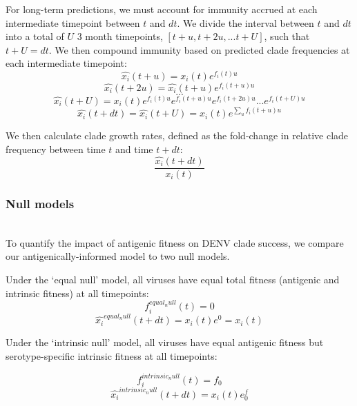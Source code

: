 \documentclass[11pt,oneside,letterpaper]{article}
\begin{document}
For long-term predictions, we must account for immunity accrued at each intermediate timepoint between $t$ and $dt$.
We divide the interval between $t$ and $dt$ into a total of $U$ 3 month timepoints, $[t+u, t+2u, ... t+U]$, such that $t+U=dt$.
We then compound immunity based on predicted clade frequencies at each intermediate timepoint:
\begin{equation}
\hat{x_i}(t+u) = x_i(t)e^{f_i(t) u}
\end{equation}
\begin{equation}
\hat{x_i}(t+2u) = \hat{x_i}(t+u) e^{f_i(t+u)u}
\end{equation}
$$...$$
\begin{equation}
\hat{x_i}(t+U) = x_i(t) e^{f_i(t)u} e^{f_i(t+u)u} e^{f_i(t+2u)u} ... e^{f_i(t+U)u}
\end{equation}
\begin{equation}
  \label{eq_compounding_immunity}
\hat{x_i}(t+dt) = \hat{x_i}(t+U) = x_i(t) e^{\sum_{u}f_i(t+u)u}
\end{equation}

We then calculate clade growth rates, defined as the fold-change in relative clade frequency between time $t$ and time $t+dt$:
\begin{equation}
  \label{eq_growth_rate}
\frac{\hat{x_i}(t+dt)}{x_i(t)}
\end{equation}

\subsubsection{Null models}\\
To quantify the impact of antigenic fitness on DENV clade success, we compare our antigenically-informed model to two null models.

Under the `equal null' model, all viruses have equal total fitness (antigenic and intrinsic fitness) at all timepoints:
\begin{equation}
  \label{equal_null}
f_i^{equal_null}(t) = 0
\end{equation}
\begin{equation}
\hat{x_i}^{equal_null}(t+dt) = x_i(t) e^0 = x_i(t)
\end{equation}

Under the `intrinsic null' model, all viruses have equal antigenic fitness but serotype-specific intrinsic fitness at all timepoints:

\begin{equation}
  \label{intrinsic_null}
  f_i^{intrinsic_null}(t) = f_0
\end{equation}
\begin{equation}
\hat{x_i}^{intrinsic_null}(t+dt) = x_i(t) e^f_0
\end{equation}
\end{document}
